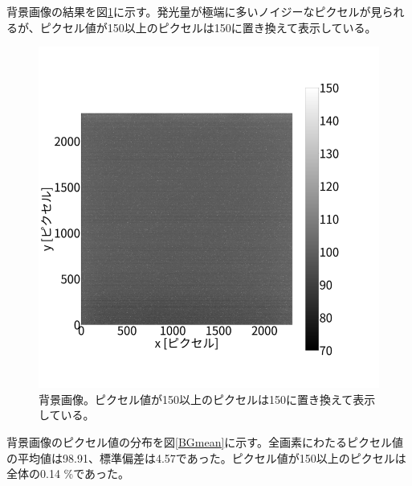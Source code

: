 \documentclass[a4paper,11pt,uplatex]{jsbook}
\begin{document}
背景画像の結果を図\ref{BG}に示す。発光量が極端に多いノイジーなピクセルが見られるが、ピクセル値が150以上のピクセルは150に置き換えて表示している。
\begin{figure}[h]
  \centering
  \includegraphics[width=0.8\linewidth]{image/4-BG.png}
  \caption{背景画像。ピクセル値が150以上のピクセルは150に置き換えて表示している。}\label{BG}
\end{figure}
背景画像のピクセル値の分布を図\ref{BGmean}に示す。全画素にわたるピクセル値の平均値は98.91、標準偏差は4.57であった。ピクセル値が150以上のピクセルは全体の0.14 \%であった。
\end{document}
